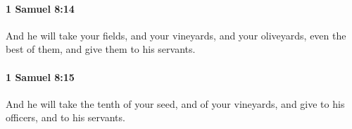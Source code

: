 		\paragraph{1 Samuel 8:14} %
			\label{1SAMUEL-8-14}

			And he will take your fields, and your vineyards, and your oliveyards, even the best of them, and give them to his servants.


		\paragraph{1 Samuel 8:15} %
			\label{1SAMUEL-8-15}

			And he will take the tenth of your seed, and of your vineyards, and give to his officers, and to his servants.


